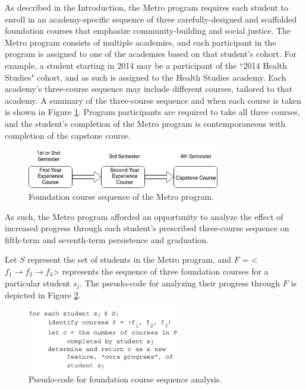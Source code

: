 As described in the Introduction, the Metro program requires each student to enroll in an academy-specific sequence of three carefully-designed and scaffolded foundation courses that emphasize community-building and social justice.   The Metro program consists of multiple academies, and each participant in the program is assigned to one of the academies based on that student's cohort.  For example, a student starting in 2014 may be a participant of the ``2014 Health Studies" cohort, and as such is assigned to the Health Studies academy.  Each academy's three-course sequence may include different courses, tailored to that academy.  A summary of the three-course sequence and when each course is taken is shown in Figure \ref{capstone}.  Program participants are required to take all three courses, and the student's completion of the Metro program is contemporaneous with completion of the capstone course. 

\vspace{5mm}
\begin{figure}[htbp]
\centering
\includegraphics[width=0.75\textwidth]{figures/capstone.jpg}
\caption{Foundation course sequence of the Metro program.}
\label{capstone}
\end{figure}
\vspace{5mm}

As such, the Metro program afforded an opportunity to analyze the effect of increased progress through each student's prescribed three-course sequence on fifth-term and seventh-term persistence and graduation. 

Let $S$ represent the set of students in the Metro program, and $F$ = \textless $f_1 \rightarrow f_2 \rightarrow f_3$\textgreater{} represents the sequence of three foundation courses for a particular student $s_j$.  The pseudo-code for analyzing their progress through $F$ is depicted in Figure \ref{pseudo_foundation}.     

\begin{figure}[htbp]
\centering
\includegraphics[width=0.6\textwidth]{figures/pathwayprogress.png}
\caption{Pseudo-code for foundation course sequence analysis.}
\label{pseudo_foundation}
\end{figure}

